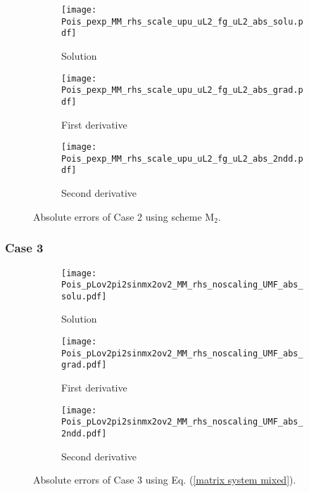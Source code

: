 \documentclass[final,3p]{elsarticle}
\begin{document}
\begin{figure}[!ht]
    \begin{subfigure}{5.5cm}
        \texttt{[image: Pois\_pexp\_MM\_rhs\_scale\_upu\_uL2\_fg\_uL2\_abs\_solu.pdf]}
        \caption{Solution}
        \label{Fig:Pois_pexp_MM_rhs_scale_upu_uL2_fg_uL2_abs_solu}
    \end{subfigure}
    \begin{subfigure}{5.5cm}
        \texttt{[image: Pois\_pexp\_MM\_rhs\_scale\_upu\_uL2\_fg\_uL2\_abs\_grad.pdf]}
        \caption{First derivative}
        \label{Fig:Pois_pexp_MM_rhs_scale_upu_uL2_fg_uL2_abs_grad}
    \end{subfigure}
    \begin{subfigure}{5.5cm}
        \texttt{[image: Pois\_pexp\_MM\_rhs\_scale\_upu\_uL2\_fg\_uL2\_abs\_2ndd.pdf]}
        \caption{Second derivative}
        \label{Fig:Pois_pexp_MM_rhs_scale_upu_uL2_fg_uL2_abs_2ndd}
    \end{subfigure}
\caption{Absolute errors of Case 2 using scheme $\text{M}_2$.}
\label{Pois_pexp_MM_rhs_scale_upu_uL2_fg_uL2_abs}
\end{figure}

\subsubsection{Case 3}

\begin{figure}[!ht]
    \begin{subfigure}{5.5cm}
        \texttt{[image: Pois\_pLov2pi2sinmx2ov2\_MM\_rhs\_noscaling\_UMF\_abs\_solu.pdf]}
        \caption{Solution}
        \label{Fig:Pois_pLov2pi2sinmx2ov2_MM_rhs_noscaling_UMF_abs_solu}
    \end{subfigure}
    \begin{subfigure}{5.5cm}
        \texttt{[image: Pois\_pLov2pi2sinmx2ov2\_MM\_rhs\_noscaling\_UMF\_abs\_grad.pdf]}
        \caption{First derivative}
        \label{Fig:Pois_pLov2pi2sinmx2ov2_MM_rhs_noscaling_UMF_abs_grad}
    \end{subfigure}
    \begin{subfigure}{5.5cm}
        \texttt{[image: Pois\_pLov2pi2sinmx2ov2\_MM\_rhs\_noscaling\_UMF\_abs\_2ndd.pdf]}
        \caption{Second derivative}
        \label{Fig:Pois_pLov2pi2sinmx2ov2_MM_rhs_noscaling_UMF_abs_2ndd}
    \end{subfigure}
\caption{Absolute errors of Case 3 using Eq. (\ref{matrix system mixed}).}
\label{Pois_pLov2pi2sinmx2ov2_MM_rhs_noscaling_UMF_abs}
\end{figure}
\end{document}
